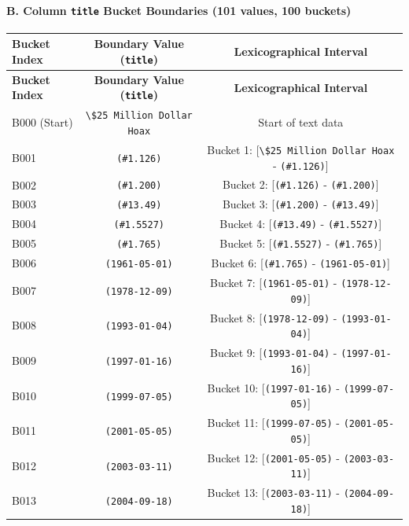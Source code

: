 \documentclass[11pt,a4paper]{article}
\begin{document}
\paragraph{B. Column \texttt{title} Bucket Boundaries (101 values, 100 buckets)}
{\begingroup
\small
\setlength{\tabcolsep}{5pt}
\begin{xltabular}{\textwidth}{l | C | C}
\toprule
\textbf{Bucket Index} & \textbf{Boundary Value (\texttt{title})} & \textbf{Lexicographical Interval} \\
\midrule
\endfirsthead
\toprule
\textbf{Bucket Index} & \textbf{Boundary Value (\texttt{title})} & \textbf{Lexicographical Interval} \\
\midrule
\endfirsthead
\endhead
\bottomrule
\endfoot
\bottomrule
\endlastfoot
B000 (Start) & \texttt{\textbackslash{}\$25 Million Dollar Hoax} & Start of text data \\
B001 & \texttt{(\#1.126)} & Bucket 1: [\texttt{\textbackslash{}\$25 Million Dollar Hoax} - \texttt{(\#1.126)}] \\
B002 & \texttt{(\#1.200)} & Bucket 2: [\texttt{(\#1.126)} - \texttt{(\#1.200)}] \\
B003 & \texttt{(\#13.49)} & Bucket 3: [\texttt{(\#1.200)} - \texttt{(\#13.49)}] \\
B004 & \texttt{(\#1.5527)} & Bucket 4: [\texttt{(\#13.49)} - \texttt{(\#1.5527)}] \\
B005 & \texttt{(\#1.765)} & Bucket 5: [\texttt{(\#1.5527)} - \texttt{(\#1.765)}] \\
B006 & \texttt{(1961-05-01)} & Bucket 6: [\texttt{(\#1.765)} - \texttt{(1961-05-01)}] \\
B007 & \texttt{(1978-12-09)} & Bucket 7: [\texttt{(1961-05-01)} - \texttt{(1978-12-09)}] \\
B008 & \texttt{(1993-01-04)} & Bucket 8: [\texttt{(1978-12-09)} - \texttt{(1993-01-04)}] \\
B009 & \texttt{(1997-01-16)} & Bucket 9: [\texttt{(1993-01-04)} - \texttt{(1997-01-16)}] \\
B010 & \texttt{(1999-07-05)} & Bucket 10: [\texttt{(1997-01-16)} - \texttt{(1999-07-05)}] \\
B011 & \texttt{(2001-05-05)} & Bucket 11: [\texttt{(1999-07-05)} - \texttt{(2001-05-05)}] \\
B012 & \texttt{(2003-03-11)} & Bucket 12: [\texttt{(2001-05-05)} - \texttt{(2003-03-11)}] \\
B013 & \texttt{(2004-09-18)} & Bucket 13: [\texttt{(2003-03-11)} - \texttt{(2004-09-18)}] \\

\end{xltabular}}
\end{document}
